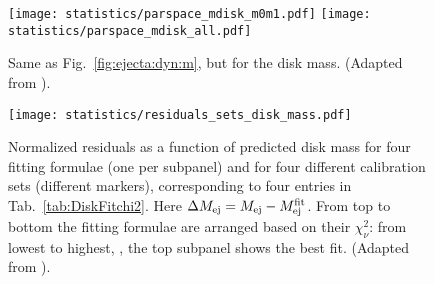 \begin{figure}[t!]
    \centering 
    \texttt{[image: statistics/parspace\_mdisk\_m0m1.pdf]}
    \texttt{[image: statistics/parspace\_mdisk\_all.pdf]}
    \caption{
        Same as Fig.~\ref{fig:ejecta:dyn:m}, but for the disk mass. 
        (Adapted from \citet{Nedora:2020qtd}).
    }
    \label{fig:mdisk_parspace}
\end{figure}
%
\begin{figure}[t!]
    \centering 
    \texttt{[image: statistics/residuals\_sets\_disk\_mass.pdf]}
    \caption{
        Normalized residuals as a function of predicted disk mass for 
        four fitting formulae (one per subpanel) and for four different 
        calibration sets (different markers), corresponding to four 
        entries in Tab.~\ref{tab:DiskFitchi2}. 
        Here 
        $\Delta M_{\rm ej} = M_{\rm ej} - M^{\rm fit}_{\rm ej}$.
        From top to bottom the fitting formulae are arranged 
        based on their $\chi_{\nu}^2$: from lowest to highest, \ie, 
        the top subpanel shows the best fit.
        (Adapted from \citet{Nedora:2020qtd}).
    }
    \label{fig:stat_mdisk}
\end{figure}

